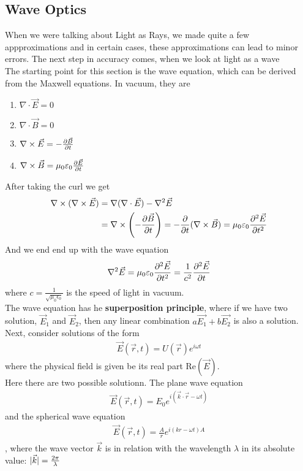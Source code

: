 


\subsection{Wave Optics}
When we were talking about Light as Rays, we made quite a few appproximations and in certain cases, these approximations can lead to minor errors. The next step in accuracy comes, when we look at light as a wave\\

The starting point for this section is the wave equation, which can be derived from the Maxwell equations. In vacuum, they are

\begin{enumerate}
				\item $\nabla \cdot \vec{E} = 0$
				\item $\nabla \cdot \vec{B} = 0$
				\item $\nabla \times \vec{E} = - \frac{\partial \vec{B}}{\partial t}$
				\item $\nabla \times \vec{B} = \mu_0 \varepsilon_0 \frac{\partial \vec{E}}{\partial t}$
\end{enumerate}
After taking the curl we get
\begin{align*}
				\nabla \times (\nabla \times \vec{E}) &= \nabla(\nabla \cdot \vec{E}) - \nabla^2 \vec{E}\\
				&= \nabla \times \left(- \frac{\partial \vec{B}}{\partial t}\right) = - \frac{\partial}{\partial t}(\nabla \times \vec{B}) = \mu_0 \varepsilon_0 \frac{\partial^2 \vec{E}}{\partial t^2}
\end{align*}
And we end end up with the wave equation
\begin{align*}
				\nabla^2 \vec{E} = \mu_0 \varepsilon_0 \frac{\partial^2 \vec{E}}{\partial t^2} = \frac{1}{c^2} \frac{\partial^2 \vec{E}}{\partial t}
\end{align*}
where $c = \frac{1}{\sqrt{\mu_0\epsilon_0}}$ is the speed of light in vacuum.\\

The wave equation has he \textbf{superposition principle}, where if we have two solution, $\vec{E}_1$ and $\vec{E}_2$, then any linear combination $a \vec{E_1} + b \vec{E_2}$ is also a solution.\\

Next, consider solutions of the form
\begin{align*}
				\vec{E}(\vec{r},t) = U(\vec{r}) e^{i\omega t}
\end{align*}
where the physical field is given be its real part $\text{Re}(\vec{E})$.\\
Here there are two possible solutionn. The plane wave equation
\begin{align*}
				\vec{E}(\vec{r},t) = E_0 e^{i(\vec{k} \cdot \vec{r} - \omega t)}
\end{align*}
and the spherical wave equation
\begin{align*}
				\vec{E}(\vec{r},t) = \frac{A}{r}e^{i(kr - \omega t)A} 
\end{align*}
, where the wave vector $\vec{k}$ is in relation with the wavelength $\lambda$ in its absolute value: $\vert\vec{k}\vert = \frac{2 \pi}{\lambda}$\\

